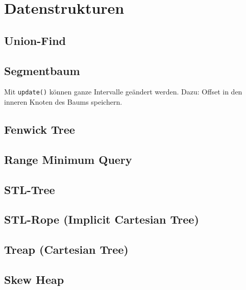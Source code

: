 \section{Datenstrukturen}

\subsection{Union-Find}


\subsection{Segmentbaum}

Mit \lstinline{update()} können ganze Intervalle geändert werden.
Dazu: Offset in den inneren Knoten des Baums speichern.

\subsection{Fenwick Tree}



\subsection{Range Minimum Query}


\subsection{STL-Tree}


\subsection{STL-Rope (Implicit Cartesian Tree)}


\subsection{Treap (Cartesian Tree)}


\subsection{Skew Heap}


